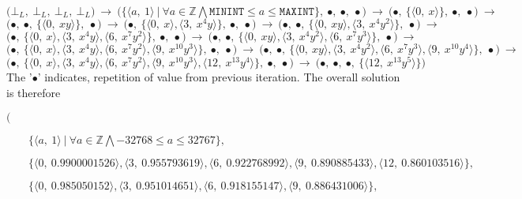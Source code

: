 \documentclass[final,3p, review, times]{util/elsarticle}
\begin{document}
\noindent
$
\bigg(\bot_L,\ \bot_L,\ \bot_L,\ \bot_L\bigg)\ \to\ 
\bigg(\Big\{\big\langle a,\ 1\big\rangle\ \big|\ \forall a\in\mathbb{Z}\bigwedge\mathtt{MININT}\leq a\leq\mathtt{MAXINT}\Big\},\ \bullet,\ \bullet,\ \bullet\bigg)\ \to\ 
\bigg(\bullet,\ \Big\{\big\langle 0,\ x\big\rangle\Big\},\ \bullet,\ \bullet\bigg)\ \to
$\\
$
\bigg(\bullet,\ \bullet,\ \Big\{\big\langle 0,\ xy\big\rangle\Big\},\ \bullet\bigg)\ \to\ 
\bigg(\bullet,\ \Big\{\big\langle 0,\ x\big\rangle,\big\langle 3,\ x^4y\big\rangle\Big\},\ \bullet,\ \bullet\bigg)\ \to\ 
\bigg(\bullet,\ \bullet,\ \Big\{\big\langle 0,\ xy\big\rangle,\big\langle 3,\ x^4y^2\big\rangle\Big\},\ \bullet\bigg)\ \to\ 
$\\
$
\bigg(\bullet,\ \Big\{\big\langle 0,\ x\big\rangle,\big\langle 3,\ x^4y\big\rangle,\big\langle 6,\ x^7y^2\big\rangle\Big\},\ \bullet,\ \bullet\bigg)\ \to\ 
\bigg(\bullet,\ \bullet,\ \Big\{\big\langle 0,\ xy\big\rangle,\big\langle 3,\ x^4y^2\big\rangle,\big\langle 6,\ x^7y^3\big\rangle\Big\},\ \bullet\bigg)\ \to\ 
$\\
$
\bigg(\bullet,\ \Big\{\big\langle 0,\ x\big\rangle,\big\langle 3,\ x^4y\big\rangle,\big\langle 6,\ x^7y^2\big\rangle,\big\langle 9,\ x^{10}y^3\big\rangle\Big\},\ \bullet,\ \bullet\bigg)\ \to\ 
\bigg(\bullet,\ \bullet,\ \Big\{\big\langle 0,\ xy\big\rangle,\big\langle 3,\ x^4y^2\big\rangle,\big\langle 6,\ x^7y^3\big\rangle,\big\langle 9,\ x^{10}y^4\big\rangle\Big\},\ \bullet\bigg)\ \to\ 
$\\
$
\bigg(\bullet,\ \Big\{\big\langle 0,\ x\big\rangle,\big\langle 3,\ x^4y\big\rangle,\big\langle 6,\ x^7y^2\big\rangle,\big\langle 9,\ x^{10}y^3\big\rangle,\big\langle 12,\ x^{13}y^4\big\rangle\Big\},\ \bullet,\ \bullet\bigg)\ \to\ 
\bigg(\bullet,\ \bullet,\ \bullet,\ \Big\{\big\langle 12,\ x^{13}y^5\big\rangle\Big\}\bigg)
$\\
       
The '$\bullet$' indicates, repetition of value from previous iteration. The overall solution is therefore

$\bigg($

$\qquad\Big\{\big\langle a,\ 1\big\rangle\ \big|\ \forall a\in\mathbb{Z}\bigwedge-32768\leq a\leq32767\Big\},
$

$\qquad\Big\{\big\langle 0,\ 0.9900001526\big\rangle,\big\langle 3,\ 0.955793619\big\rangle,\big\langle 6,\ 0.922768992\big\rangle,\big\langle 9,\ 0.890885433\big\rangle,\big\langle 12,\ 0.860103516\big\rangle\Big\},
$

$\qquad\Big\{\big\langle 0,\ 0.985050152\big\rangle,\big\langle 3,\ 0.951014651\big\rangle,\big\langle 6,\ 0.918155147\big\rangle,\big\langle 9,\ 0.886431006\big\rangle\Big\},
$
\end{document}
